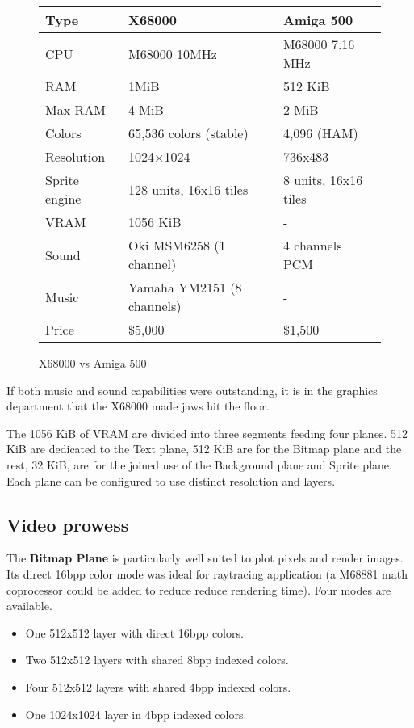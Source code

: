  \begin{figure}[H]
\begin{tabularx}{\textwidth}{lXX}
  \toprule    
  \textbf{Type } & \textbf{ X68000 } & \textbf{ Amiga 500 }\\  
  \toprule   
    
CPU & M68000 10MHz & M68000 7.16 MHz\\  
RAM & 1MiB & 512 KiB\\
Max RAM & 4 MiB & 2 MiB\\ 
Colors  & 65,536 colors (stable) & 4,096 (HAM) \\
Resolution & 1024×1024 & 736x483 \\
Sprite engine & 128 units, 16x16 tiles & 8 units, 16x16 tiles\\
VRAM & 1056 KiB & -\\
Sound & Oki MSM6258 (1 channel)  & 4 channels PCM\\ 
Music & Yamaha YM2151 (8 channels)  & -\\ 
Price & \$5,000 & \$1,500 \\
  \toprule   
\end{tabularx}
\caption*{X68000 vs Amiga 500}
\end{figure}


If both music and sound capabilities were outstanding, it is in the graphics department that the X68000 made jaws hit the floor.

The 1056 KiB of VRAM are divided into three segments feeding four planes. 512 KiB are dedicated to the Text plane, 512 KiB are for the Bitmap plane and the rest, 32 KiB, are for the joined use of the Background plane and Sprite plane. Each plane can be configured to use distinct resolution and layers.

\subsection{Video prowess}

The \textbf{Bitmap Plane} is particularly well suited to plot pixels and render images. Its direct 16bpp color mode was ideal for raytracing application (a M68881 math coprocessor could be added to reduce reduce rendering time). Four modes are available.


\begin{itemize}[topsep=0pt]
\item One 512x512 layer with direct 16bpp colors.
\item Two 512x512 layers with shared 8bpp indexed colors.
\item Four 512x512 layers with shared 4bpp indexed colors.
\item One 1024x1024 layer in 4bpp indexed colors.
\end{itemize}

